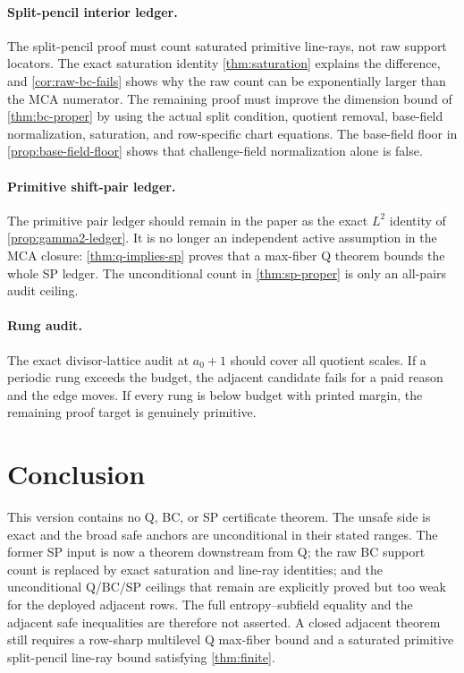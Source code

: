 \documentclass[a4paper,11pt]{amsart}
\theoremstyle{remark}
\begin{document}
\paragraph{Split-pencil interior ledger.}  The split-pencil proof must count saturated primitive line-rays, not raw support locators.  The exact saturation identity \cref{thm:saturation} explains the difference, and \cref{cor:raw-bc-fails} shows why the raw count can be exponentially larger than the MCA numerator.  The remaining proof must improve the dimension bound of \cref{thm:bc-proper} by using the actual split condition, quotient removal, base-field normalization, saturation, and row-specific chart equations.  The base-field floor in \cref{prop:base-field-floor} shows that challenge-field normalization alone is false.

\paragraph{Primitive shift-pair ledger.}  The primitive pair ledger should remain in the paper as the exact \(L^2\) identity of \cref{prop:gamma2-ledger}.  It is no longer an independent active assumption in the MCA closure: \cref{thm:q-implies-sp} proves that a max-fiber Q theorem bounds the whole SP ledger.  The unconditional count in \cref{thm:sp-proper} is only an all-pairs audit ceiling.

\paragraph{Rung audit.}  The exact divisor-lattice audit at \(a_0+1\) should cover all quotient scales.  If a periodic rung exceeds the budget, the adjacent candidate fails for a paid reason and the edge moves.  If every rung is below budget with printed margin, the remaining proof target is genuinely primitive.

\section{Conclusion}

This version contains no Q, BC, or SP certificate theorem.  The unsafe side is exact and the broad safe anchors are unconditional in their stated ranges.  The former SP input is now a theorem downstream from Q; the raw BC support count is replaced by exact saturation and line-ray identities; and the unconditional Q/BC/SP ceilings that remain are explicitly proved but too weak for the deployed adjacent rows.  The full entropy--subfield equality and the adjacent safe inequalities are therefore not asserted.  A closed adjacent theorem still requires a row-sharp multilevel Q max-fiber bound and a saturated primitive split-pencil line-ray bound satisfying \cref{thm:finite}.
\end{document}
